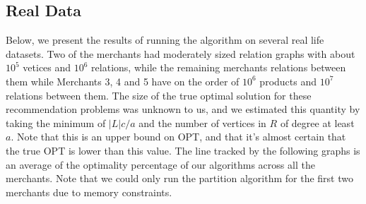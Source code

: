 \subsection{Real Data}
Below, we present the results of running the algorithm on several real life datasets. Two of the merchants had moderately sized relation graphs with about $10^5$ vetices and $10^6$ relations, while the remaining merchants relations between them while Merchants 3, 4 and 5 have on the order of $10^6$ products and $10^7$ relations between them. The size of the true optimal solution for these recommendation problems was unknown to us, and we estimated this quantity by taking the minimum of $|L|c/a$ and the number of vertices in $R$ of degree at least $a$. Note that this is an upper bound on OPT, and that it's almost certain that the true OPT is lower than this value. The line tracked by the following graphs is an average of the optimality percentage of our algorithms across all the merchants. Note that we could only run the partition algorithm for the first two merchants due to memory constraints. \vs

